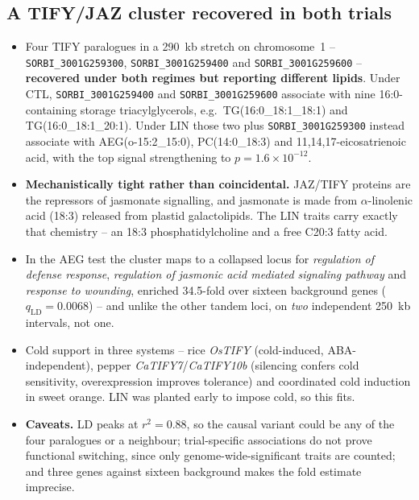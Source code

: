 \documentclass[11pt]{article}
\newcommand{\lead}[1]{\textbf{#1}}
\begin{document}
\subsection{A TIFY/JAZ cluster recovered in both trials}
\begin{itemize}
  \item Four TIFY paralogues in a 290~kb stretch on chromosome~1 --
        \texttt{SORBI\_3001G259300}, \texttt{SORBI\_3001G259400} and
        \texttt{SORBI\_3001G259600} -- \lead{recovered under both regimes but
        reporting different lipids}. Under CTL, \texttt{SORBI\_3001G259400} and
        \texttt{SORBI\_3001G259600} associate with nine 16:0-containing storage
        triacylglycerols, e.g.\ TG(16:0\_18:1\_18:1) and TG(16:0\_18:1\_20:1).
        Under LIN those two plus \texttt{SORBI\_3001G259300} instead associate
        with AEG(o-15:2\_15:0), PC(14:0\_18:3) and 11,14,17-eicosatrienoic acid,
        with the top signal strengthening to $p=1.6\times10^{-12}$.
  \item \lead{Mechanistically tight rather than coincidental.} JAZ/TIFY proteins
        are the repressors of jasmonate signalling, and jasmonate is made from
        $\alpha$-linolenic acid (18:3) released from plastid galactolipids. The
        LIN traits carry exactly that chemistry -- an 18:3 phosphatidylcholine and
        a free C20:3 fatty acid.
  \item In the AEG test the cluster maps to a collapsed locus for
        \textit{regulation of defense response}, \textit{regulation of jasmonic
        acid mediated signaling pathway} and \textit{response to wounding},
        enriched 34.5-fold over sixteen background genes
        ($q_{\mathrm{LD}}=0.0068$) -- and unlike the other tandem loci, on
        \emph{two} independent 250~kb intervals, not one.
  \item Cold support in three systems -- rice \textit{OsTIFY} (cold-induced,
        ABA-independent), pepper \textit{CaTIFY7}/\textit{CaTIFY10b} (silencing
        confers cold sensitivity, overexpression improves tolerance) and
        coordinated cold induction in sweet orange. LIN was planted early to
        impose cold, so this fits.
  \item \lead{Caveats.} LD peaks at $r^2=0.88$, so the causal variant could be any
        of the four paralogues or a neighbour; trial-specific associations do not
        prove functional switching, since only genome-wide-significant traits are
        counted; and three genes against sixteen background makes the fold
        estimate imprecise.
\end{itemize}
\end{document}

